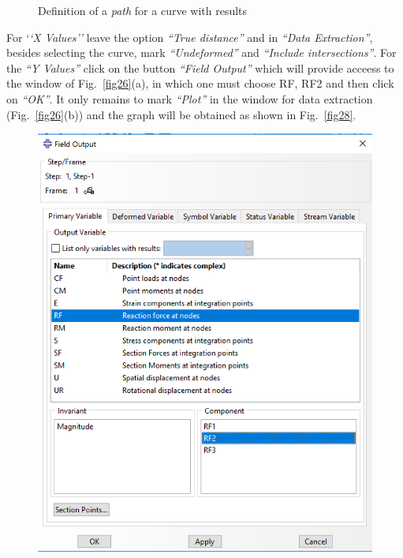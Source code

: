 \documentclass[english,a4paper,12pt]{article}
\begin{document}
\begin{enumerate}
\begin{figure}[h!tp]
  \caption{Definition of a \emph{path} for a curve with results}
  \label{fig22}
\end{figure}
For `\emph{`X Values''} leave the option \emph{``True distance''} and in \emph{``Data Extraction''}, besides selecting the curve, mark \emph{``Undeformed''} and \emph{``Include intersections''}. 
For the \emph{``Y Values''} click on the button \emph{``Field Output''} which will provide acceess to the window of
Fig.~\ref{fig26}(a), 
in which one must choose RF, RF2 and then click on \emph{``OK''}.
It only remains to mark \emph{``Plot''} in the window for data extraction
(Fig.~\ref{fig26}(b)) 
and the graph will be obtained as shown in
Fig.~\ref{fig28}.
\begin{figure}[h!tp]
  \begin{center}
    \subfigure[Component RF2]%
	{\includegraphics[scale=0.45]{capturas2019/a_fig40pa.png}}

\end{center}
\end{figure}
\end{enumerate}
\end{document}
